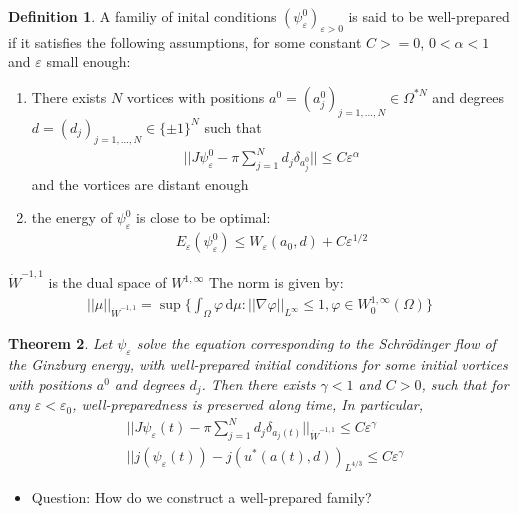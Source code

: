 \documentclass[12pt, a4paper]{article}
\theoremstyle{plain}
\newtheorem{theorem}{Theorem}[section]
\theoremstyle{definition}
\newtheorem{definition}[theorem]{Definition}
\newcommand{\psieps}{\psi_\varepsilon}
\newcommand{\dd}{\,\mathrm{d}}
\begin{document}
\begin{definition}
  A familiy of inital conditions $(\psieps^0)_{\varepsilon>0}$ is said to be well-prepared if it satisfies the following assumptions,
  for some constant $C>=0$, $0<\alpha<1$ and $\varepsilon$ small enough:
  \begin{enumerate}
    \item There exists $N$ vortices with positions
    $a^0 = (a^0_j)_{j=1, \ldots , N} \in \Omega^{*N}$
    and degrees $d= (d_j)_{j=1, \ldots, N} \in \{\pm 1\}^N$
    such that
    \begin{align}
      ||J\psieps^0 - \pi \sum^N_{j=1} d_j \delta_{a_j^0}|| \leq C \varepsilon^\alpha 
    \end{align}
    and the vortices are distant enough
    \item the energy of $\psieps^0$ is close to be optimal:
    \begin{align}
      E_\varepsilon (\psieps^0) \leq W_\varepsilon (a_0, d) + C \varepsilon^{1/2}
    \end{align}
  \end{enumerate}
\end{definition}
$\dot W^{-1, 1}$ is the dual space of $W^{1, \infty}$
The norm is given by:
\begin{align}
    ||\mu||_{\dot W^{-1, 1}} = \sup \{\int_\Omega \varphi \dd \mu : ||\nabla \varphi||_{L^\infty} \leq 1, \varphi \in W^{1, \infty}_0 (\Omega)\}
\end{align}

\begin{theorem}
    Let $\psieps$ solve the equation corresponding to the Schrödinger flow of the Ginzburg energy, with well-prepared initial conditions
    for some initial vortices with positions $a^0$ and degrees $d_j$.
    Then there exists $\gamma < 1$ and $C > 0$, such that for any $\varepsilon < \varepsilon_0$,
    well-preparedness is preserved along time,
In particular,
\begin{align}
    &||J \psieps (t) - \pi \sum^N_{j=1} d_j \delta_{a_j (t)} ||_{\dot W^{-1, 1}} \leq C \varepsilon^\gamma \\
    & || j(\psieps (t)) - j(u^* (a(t), d))_{L^{4/3}} \leq C \varepsilon^\gamma
\end{align}
\end{theorem}

\begin{itemize}
    \item Question: How do we construct a well-prepared family?
\end{itemize}
\end{document}

